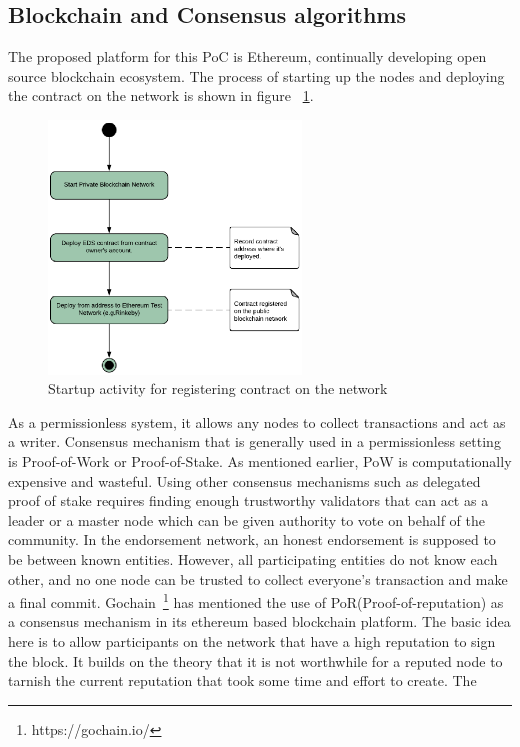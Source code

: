 \subsection{Blockchain and Consensus algorithms}\label{subsec:bcConsensus}
The proposed platform for this PoC is Ethereum, continually developing open
source blockchain ecosystem. The process of starting up the nodes and deploying
the contract on the network is shown in figure ~\ref{fig:startup}. 
\begin{figure}
	\centering
	\includegraphics[width=0.6\textwidth]{Images/ActivityDiagramStartUpBC.eps}
	\caption{Startup activity for registering contract on the network}
	\label{fig:startup}
\end{figure}
As a permissionless system, it allows any nodes to collect transactions and act
as a writer. Consensus mechanism that is generally used in a permissionless
setting is Proof-of-Work or Proof-of-Stake. As mentioned earlier, PoW is
computationally expensive and wasteful. Using other consensus mechanisms such
as delegated proof of stake requires finding enough trustworthy validators that
can act as a leader or a master node which can be given authority to vote on
behalf of the community. In the endorsement network, an honest endorsement is
supposed to be between known entities. However, all participating entities do
not know each other, and no one node can be trusted to collect everyone's
transaction and make a final commit. Gochain~\footnote{https://gochain.io/} has
mentioned the use of PoR(Proof-of-reputation) as a consensus mechanism in its
ethereum based blockchain platform. The basic idea here is to allow
participants on the network that have a high reputation to sign the block. It
builds on the theory that it is not worthwhile for a reputed node to tarnish
the current reputation that took some time and effort to create. The
